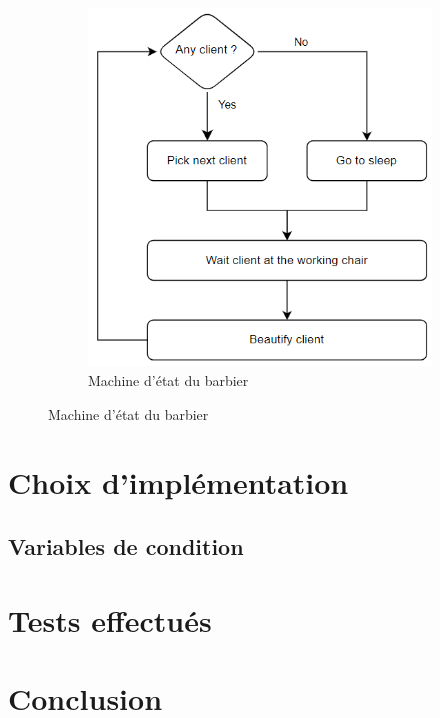\documentclass{article}
\begin{document}
\begin{figure}
\begin{subfigure}[b]{0.4\textwidth}
        \includegraphics[width=\textwidth]{figures/machine_etat_barbier.png}
        \caption{Machine d'état du barbier}
        \label{fig:machine état barbier}
    \end{subfigure}
\end{figure}

\section*{Choix d'implémentation}

\subsection*{Variables de condition}

\section*{Tests effectués}

\section*{Conclusion}
\end{document}

